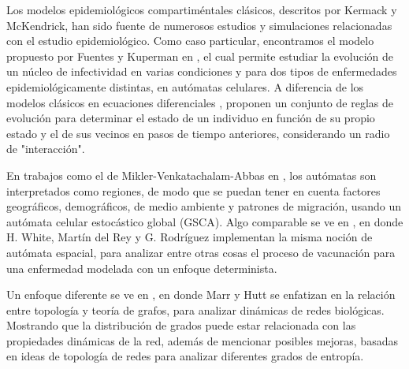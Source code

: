 
Los modelos epidemiológicos compartiméntales clásicos, descritos por Kermack y McKendrick, han sido fuente de numerosos estudios y simulaciones relacionadas con el estudio epidemiológico. Como caso particular, encontramos el modelo propuesto por Fuentes y Kuperman en \cite{spatialDependences}, el cual permite estudiar la evolución de un núcleo de infectividad en varias condiciones y para dos tipos de enfermedades epidemiológicamente distintas, en autómatas celulares. A diferencia de los modelos clásicos en ecuaciones diferenciales \cite{diego2010}, proponen un conjunto de reglas de evolución para determinar el estado de un individuo en función de su propio estado y el de sus vecinos en pasos de tiempo anteriores, considerando un radio de "interacción".

En trabajos como el de Mikler-Venkatachalam-Abbas en \cite{globalStochastic}, los autómatas son interpretados como regiones, de modo que se puedan tener en cuenta factores geográficos, demográficos, de medio ambiente y patrones de migración, usando un autómata celular estocástico global (GSCA). Algo comparable se ve en \cite{modelingEpidemicsUsingCA}, en donde H. White, Martín del Rey y G. Rodríguez implementan la misma noción de autómata espacial, para analizar entre otras cosas el proceso de vacunación para una enfermedad modelada con un enfoque determinista.

Un enfoque diferente se ve en \cite{entropyDynamics}, en donde Marr y Hutt se enfatizan en la relación entre topología y teoría de grafos, para analizar dinámicas de redes biológicas. Mostrando que la distribución de grados puede estar relacionada con las propiedades dinámicas de la red, además de mencionar posibles mejoras, basadas en ideas de topología de redes para analizar diferentes grados de entropía.